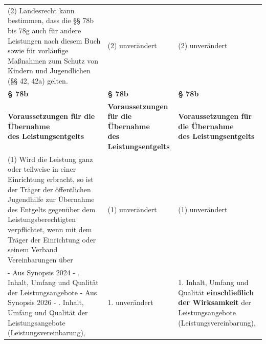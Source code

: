 \documentclass[10pt,a4paper,landscape]{article}
\begin{document}
\begin{longtable}{|L{8.2cm}|L{8.2cm}|L{8.2cm}|}
\hhline{|---|}
(2) Landesrecht kann bestimmen, dass die  \newline \S{}\S{} 78b bis 78g auch für andere Leistungen  \newline nach diesem Buch sowie für vorläufige  \newline Maßnahmen zum Schutz von Kindern und  \newline Jugendlichen (\S{}\S{} 42, 42a) gelten. & (2) unverändert & (2) unverändert \\
\hhline{|---|}
\textbf{\S{} 78b} & \textbf{\S{} 78b} & \textbf{\S{} 78b} \\
\hhline{|---|}
\textbf{Voraussetzungen für die Übernahme  \newline des Leistungsentgelts} & \textbf{Voraussetzungen für die Übernahme  \newline des Leistungsentgelts} & \textbf{Voraussetzungen für die Übernahme  \newline des Leistungsentgelts} \\
\hhline{|---|}
(1) Wird die Leistung ganz oder teilweise in  \newline einer Einrichtung erbracht, so ist der Träger  \newline der öffentlichen Jugendhilfe zur Übernahme  \newline des Entgelts gegenüber dem  \newline Leistungsberechtigten verpflichtet, wenn mit  \newline dem Träger der Einrichtung oder seinem  \newline Verband Vereinbarungen über & (1) unverändert & (1) unverändert \\
\hhline{|---|}
- Aus Synopsis 2024 - .  \newline Inhalt, Umfang und Qualität der  \newline Leistungsangebote  \newline - Aus Synopsis 2026 - .  \newline Inhalt, Umfang und Qualität der  \newline Leistungsangebote  \newline (Leistungsvereinbarung), & 1. unverändert & 1.  \newline Inhalt, Umfang und Qualität \textbf{\textcolor{diffgreen}{einschließlich  \newline der Wirksamkeit}} der Leistungsangebote  \newline (Leistungsvereinbarung), \\

\end{longtable}
\end{document}
